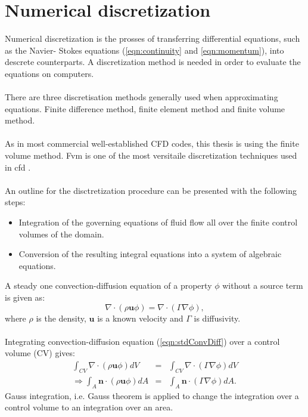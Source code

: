\documentclass[a4paper, 12pt]{report}
\begin{document}
\section{Numerical discretization}
\label{sec:NumericalDiscretization}
Numerical discretization is the prosses of transferring differential equations, such as the Navier- Stokes equations (\ref{eqn:continuity} and \ref{eqn:momentum}), into descrete counterparts.
A discretization method is needed in order to evaluate the equations on computers. \\
\\
There are three discretisation methods generally used when approximating equations. Finite difference method, finite element method and finite volume method.\\
\\
As in most commercial well-established CFD codes, this thesis is using the finite volume method. Fvm is one of the most versitaile discretization techniques used in cfd \cite{CFD}.\\
\\
An outline for the disctretization procedure can be presented with the following steps:
\begin{itemize}
\item Integration of the governing equations of fluid flow all over the finite control volumes of the domain.
\item Conversion of the resulting integral equations into a system of algebraic equations.
\end{itemize}
A steady one convection-diffusion equation of a property $\phi$ without a source term is given as:
\begin{equation}
\nabla \cdot (\rho \mathbf{u} \phi) =  \nabla \cdot (\Gamma \nabla \phi),
\label{eqn:stdConvDiff}
\end{equation}
where $\rho$ is the density, $\mathbf{u}$ is a known velocity and $\Gamma$ is diffusivity.\\
\\
Integrating convection-diffusion equation (\ref{eqn:stdConvDiff}) over a control volume (CV) gives:
\begin{eqnarray}
\int_{CV} \nabla \cdot (\rho \mathbf{u} \phi) dV &=& \int_{CV} \nabla \cdot (\Gamma \nabla  \phi) dV \nonumber \\
\label{eqn:intStdConvDiff}
\Rightarrow \int_{A} \mathbf{n} \cdot (\rho \mathbf{u} \phi) dA &=& \int_{A} \mathbf{n} \cdot (\Gamma \nabla  \phi) dA.
\end{eqnarray}
Gauss integration, i.e. Gauss theorem \cite{CFD} is applied to change the integration over a control volume to an integration over an area.
\end{document}

